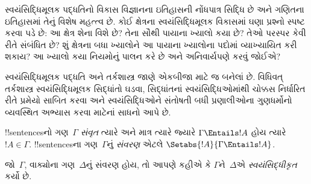 \documentclass[../../../include/open-logic-section]{subfiles}
\begin{document}

\begin{explain}
સ્વયંસિદ્ધિમૂલક પદ્ધતિનો વિકાસ વિજ્ઞાનના ઇતિહાસની નોંધપાત્ર સિદ્ધિ
છે અને ગણિતના ઇતિહાસમાં તેનું વિશેષ મહત્ત્વ છે. કોઈ ક્ષેત્રના
સ્વયંસિદ્ધિમૂલક વિકાસમાં ઘણા પ્રશ્નો સ્પષ્ટ કરવા પડે છે: આ ક્ષેત્ર
શેના વિશે છે? તેના સૌથી પાયાના ખ્યાલો કયા છે? તેઓ પરસ્પર કેવી રીતે
સંબંધિત છે? શું ક્ષેત્રના બધા ખ્યાલોને આ પાયાના ખ્યાલોના પદોમાં
વ્યાખ્યાયિત કરી શકાય? આ ખ્યાલો કયા નિયમોનું પાલન કરે છે અને અનિવાર્યપણે
કરવું જોઈએ?

સ્વયંસિદ્ધિમૂલક પદ્ધતિ અને તર્કશાસ્ત્ર જાણે એકબીજા માટે જ બનેલાં છે.
વિધિવત્ તર્કશાસ્ત્ર સ્વયંસિદ્ધિમૂલક સિદ્ધાંતો ઘડવા, સિદ્ધાંતનાં
સ્વયંસિદ્ધિઓમાંથી ચોક્કસ નિર્ધારિત રીતે પ્રમેયો સાબિત કરવા અને
સ્વયંસિદ્ધિઓને સંતોષતી બધી પ્રણાલીઓના ગુણધર્મોનો વ્યવસ્થિત અભ્યાસ
કરવા માટેનાં સાધનો આપે છે.
\end{explain}

\begin{defn}
!!{sentence}sનો ગણ~$\Gamma$ \emph{સંવૃત} ત્યારે અને માત્ર ત્યારે
જ્યારે $\Gamma \Entails !A$ હોય ત્યારે $!A \in \Gamma$. !!{sentence}sના
ગણ~$\Gamma$નું \emph{સંવરણ} એટલે
$\Setabs{!A}{\Gamma \Entails !A}$.

જો~$\Gamma$, વાક્યોના ગણ~$\Delta$નું સંવરણ હોય, તો આપણે કહીએ કે
$\Gamma$ને~$\Delta$એ \emph{સ્વયંસિદ્ધીકૃત} કર્યો છે.
\end{defn}
\end{document}
